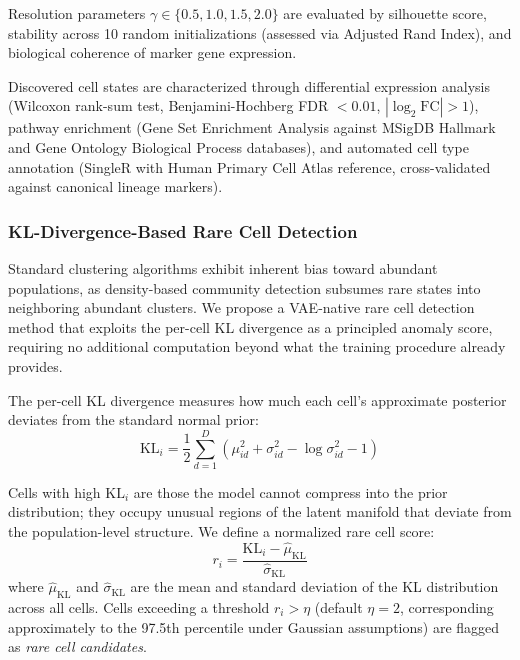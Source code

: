 \documentclass{article}
\newcommand{\KL}{\mathrm{KL}}
\begin{document}
Resolution parameters $\gamma \in \{0.5, 1.0, 1.5, 2.0\}$ are evaluated by silhouette score, stability across 10 random initializations (assessed via Adjusted Rand Index), and biological coherence of marker gene expression.

Discovered cell states are characterized through differential expression analysis (Wilcoxon rank-sum test, Benjamini-Hochberg FDR $< 0.01$, $|\log_2\text{FC}| > 1$), pathway enrichment (Gene Set Enrichment Analysis against MSigDB Hallmark and Gene Ontology Biological Process databases), and automated cell type annotation (SingleR \cite{aran2019reference} with Human Primary Cell Atlas reference, cross-validated against canonical lineage markers).


\subsubsection{KL-Divergence-Based Rare Cell Detection}
\label{sec:rare_cell}

Standard clustering algorithms exhibit inherent bias toward abundant populations, as density-based community detection subsumes rare states into neighboring abundant clusters. We propose a VAE-native rare cell detection method that exploits the per-cell KL divergence as a principled anomaly score, requiring no additional computation beyond what the training procedure already provides.

The per-cell KL divergence measures how much each cell's approximate posterior deviates from the standard normal prior:
\begin{equation}
    \KL_i = \frac{1}{2} \sum_{d=1}^{D} \left(\mu_{id}^2 + \sigma_{id}^2 - \log \sigma_{id}^2 - 1\right)
    \label{eq:per_cell_kl}
\end{equation}

Cells with high $\KL_i$ are those the model cannot compress into the prior distribution; they occupy unusual regions of the latent manifold that deviate from the population-level structure. We define a normalized rare cell score:
\begin{equation}
    r_i = \frac{\KL_i - \hat{\mu}_{\KL}}{\hat{\sigma}_{\KL}}
    \label{eq:rare_score}
\end{equation}
where $\hat{\mu}_{\KL}$ and $\hat{\sigma}_{\KL}$ are the mean and standard deviation of the KL distribution across all cells. Cells exceeding a threshold $r_i > \eta$ (default $\eta = 2$, corresponding approximately to the 97.5th percentile under Gaussian assumptions) are flagged as \textit{rare cell candidates}.
\end{document}
